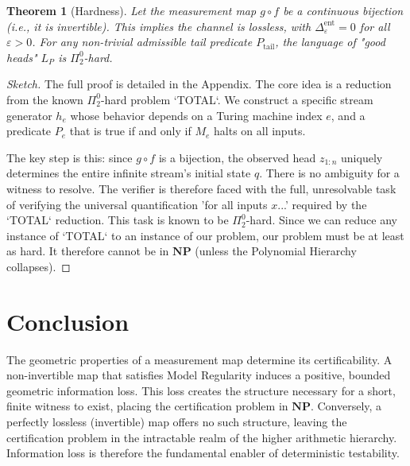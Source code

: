 \documentclass[12pt]{article}
\theoremstyle{definition}
\theoremstyle{plain}
\newtheorem{theorem}{Theorem}[section]
\begin{document}
\begin{theorem}[Hardness]\label{thm:hardness}
Let the measurement map $g \circ f$ be a continuous bijection (i.e., it is invertible). This implies the channel is lossless, with $\Delta^{\text{ent}}_\varepsilon = 0$ for all $\varepsilon > 0$. For any non-trivial admissible tail predicate $P_{\mathrm{tail}}$, the language of "good heads" $L_P$ is $\Pi^0_2$-hard.
\end{theorem}
\begin{proof}[Sketch]
The full proof is detailed in the Appendix. The core idea is a reduction from the known $\Pi^0_2$-hard problem `TOTAL`. We construct a specific stream generator $h_e$ whose behavior depends on a Turing machine index $e$, and a predicate $P_e$ that is true if and only if $M_e$ halts on all inputs.

The key step is this: since $g \circ f$ is a bijection, the observed head $z_{1:n}$ uniquely determines the entire infinite stream’s initial state $q$. There is no ambiguity for a witness to resolve. The verifier is therefore faced with the full, unresolvable task of verifying the universal quantification 'for all inputs $x$...' required by the `TOTAL` reduction. This task is known to be $\Pi^0_2$-hard. Since we can reduce any instance of `TOTAL` to an instance of our problem, our problem must be at least as hard. It therefore cannot be in $\mathbf{NP}$ (unless the Polynomial Hierarchy collapses).
\end{proof}

\section{Conclusion}

The geometric properties of a measurement map determine its certificability. A non-invertible map that satisfies Model Regularity induces a positive, bounded geometric information loss. This loss creates the structure necessary for a short, finite witness to exist, placing the certification problem in $\mathbf{NP}$. Conversely, a perfectly lossless (invertible) map offers no such structure, leaving the certification problem in the intractable realm of the higher arithmetic hierarchy. Information loss is therefore the fundamental enabler of deterministic testability.
\end{document}
